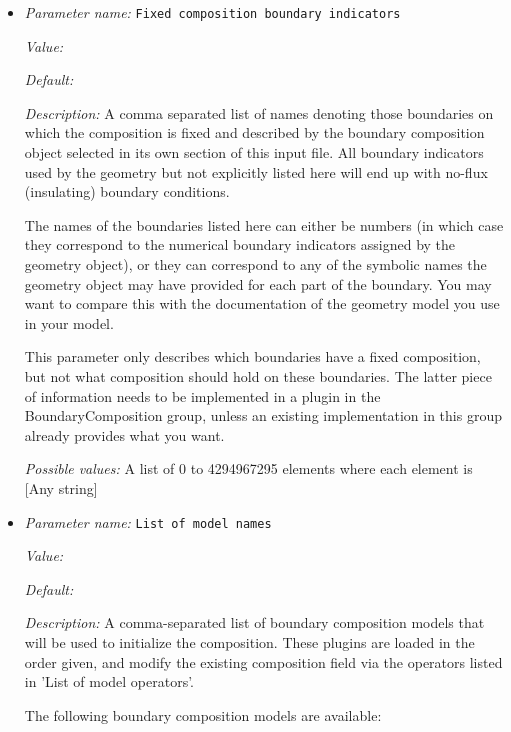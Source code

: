 \begin{itemize}
{\it Possible values:} Any one of true, false, false for models without melt
\item {\it Parameter name:} {\tt Fixed composition boundary indicators}
\label{parameters:Boundary composition model/Fixed composition boundary indicators}


{\it Value:} 


{\it Default:} 


{\it Description:} A comma separated list of names denoting those boundaries on which the composition is fixed and described by the boundary composition object selected in its own section of this input file. All boundary indicators used by the geometry but not explicitly listed here will end up with no-flux (insulating) boundary conditions.

The names of the boundaries listed here can either be numbers (in which case they correspond to the numerical boundary indicators assigned by the geometry object), or they can correspond to any of the symbolic names the geometry object may have provided for each part of the boundary. You may want to compare this with the documentation of the geometry model you use in your model.

This parameter only describes which boundaries have a fixed composition, but not what composition should hold on these boundaries. The latter piece of information needs to be implemented in a plugin in the BoundaryComposition group, unless an existing implementation in this group already provides what you want.


{\it Possible values:} A list of 0 to 4294967295 elements where each element is [Any string]
\item {\it Parameter name:} {\tt List of model names}
\label{parameters:Boundary composition model/List of model names}


{\it Value:} 


{\it Default:} 


{\it Description:} A comma-separated list of boundary composition models that will be used to initialize the composition. These plugins are loaded in the order given, and modify the existing composition field via the operators listed in 'List of model operators'.

The following boundary composition models are available:


\end{itemize}
